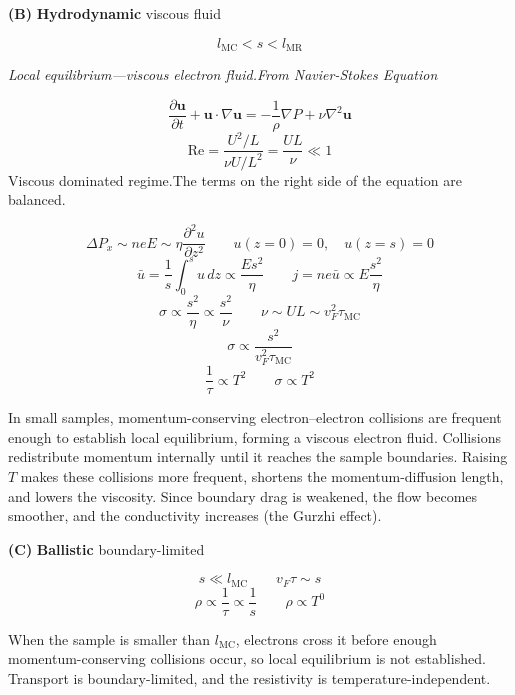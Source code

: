 \documentclass[10pt]{article}
\newcommand{\smallnote}[1]{{\fontsize{9.4}{11.3}\selectfont\color{Muted}#1}}
\begin{document}
\begin{minipage}[t]{0.31\textwidth}
	\vfill
	\begin{regimeTeal}
		{\sffamily\bfseries\fontsize{13}{15.3}\selectfont\color{Teal}(B)}\quad
		{\sffamily\bfseries\fontsize{11.8}{14.2}\selectfont Hydrodynamic}\hfill
		{\smallnote{viscous fluid}}\par\vspace{1pt}
		\[
			l_{\mathrm{MC}}<s<l_{\mathrm{MR}}
		\]
		{\fontsize{10.6}{13.2}\selectfont\itshape Local equilibrium---viscous electron fluid.From Navier-Stokes Equation\par}
		\[
			\frac{\partial\mathbf u}{\partial t}
			+\mathbf u\cdot\nabla\mathbf u
			=-\frac{1}{\rho}\nabla P
			+\nu\nabla^2\mathbf u
		\]
		\[
			\mathrm{Re}
			=\frac{U^2/L}{\nu U/L^2}
			=\frac{UL}{\nu}\ll1
		\]
		{\smallnote{Viscous dominated regime.The terms on the right side of the equation are balanced.}}\par\vspace{1pt}
		\[
			\Delta P_x\sim neE
			\sim\eta\frac{\partial^2u}{\partial z^2}
			\qquad
			u(z=0)=0,\quad u(z=s)=0
		\]
		\[
			\bar u=\frac{1}{s}\int_0^s u\,dz
			\propto\frac{E s^2}{\eta}
			\qquad
			j=ne\bar u
			\propto E\frac{s^2}{\eta}
		\]
		\[
			\sigma\propto\frac{s^2}{\eta}
			\propto\frac{s^2}{\nu}
			\qquad
			\nu\sim UL \sim  v_F^2\tau_{\mathrm{MC}}
		\]
		\[\sigma \propto \frac{ s^2}{ v_F^2\tau_{\mathrm{MC}}}\]
		\[
			\frac{1}{\tau}\propto T^2
			\qquad
			\sigma \propto T^2
		\]
		{\fontsize{10.6}{13.2}\selectfont
		In small samples, momentum-conserving electron--electron collisions are frequent enough to establish local equilibrium, forming a viscous electron fluid. Collisions    redistribute momentum internally until it reaches the sample boundaries. Raising $T$ makes these collisions more frequent, shortens the momentum-diffusion length, and lowers the viscosity. Since boundary drag is weakened, the flow becomes smoother, and the conductivity increases (the Gurzhi effect).\par}
	 
	\end{regimeTeal}

	\vfill
	\begin{regimeOrange}
		{\sffamily\bfseries\fontsize{13}{15.3}\selectfont\color{Orange}(C)}\quad
		{\sffamily\bfseries\fontsize{11.8}{14.2}\selectfont Ballistic}\hfill
		{\smallnote{boundary-limited}}\par\vspace{1pt}
		\[
			s\ll l_{\mathrm{MC}}
			\qquad
			v_F\tau\sim s
		\]
		\[
			\rho\propto\frac{1}{\tau}\propto\frac{1}{s}
			\qquad
			\rho\propto T^0
		\]
		{\fontsize{10.6}{13.2}\selectfont
		When the sample is smaller than $l_{\mathrm{MC}}$, electrons cross it before enough momentum-conserving collisions occur, so local equilibrium is not established. Transport is boundary-limited, and the resistivity is temperature-independent.\par}
	\end{regimeOrange}


\end{minipage}
\end{document}
